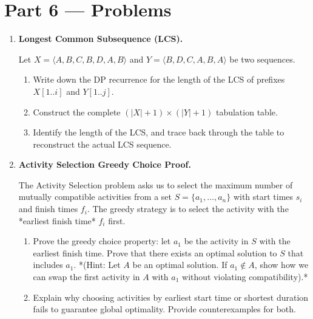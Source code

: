 \documentclass[12pt, a4paper]{book}
\begin{document}
\newpage

\section{Part 6 --- Problems}

\begin{problembox}
\begin{enumerate}[label=\textbf{P\arabic*.}]
  \item \textbf{Longest Common Subsequence (LCS).}
  
        Let $X = \langle A, B, C, B, D, A, B \rangle$ and $Y = \langle B, D, C, A, B, A \rangle$ be two sequences.
        \begin{enumerate}[label=(\alph*)]
          \item Write down the DP recurrence for the length of the LCS of prefixes $X[1..i]$ and $Y[1..j]$.
          \item Construct the complete $(|X|+1) \times (|Y|+1)$ tabulation table.
          \item Identify the length of the LCS, and trace back through the table to reconstruct the actual LCS sequence.
        \end{enumerate}

  \item \textbf{Activity Selection Greedy Choice Proof.}
  
        The Activity Selection problem asks us to select the maximum number of mutually compatible activities from a set $S = \{a_1, \dots, a_n\}$ with start times $s_i$ and finish times $f_i$.
        The greedy strategy is to select the activity with the *earliest finish time* $f_i$ first.
        \begin{enumerate}[label=(\alph*)]
          \item Prove the greedy choice property: let $a_1$ be the activity in $S$ with the earliest finish time.
                Prove that there exists an optimal solution to $S$ that includes $a_1$.
                *(Hint: Let $A$ be an optimal solution. If $a_1 \notin A$, show how we can swap the first activity in $A$ with $a_1$ without violating compatibility).*
          \item Explain why choosing activities by earliest start time or shortest duration fails to guarantee global optimality. Provide counterexamples for both.
        \end{enumerate}
\end{enumerate}
\end{problembox}
\end{document}
